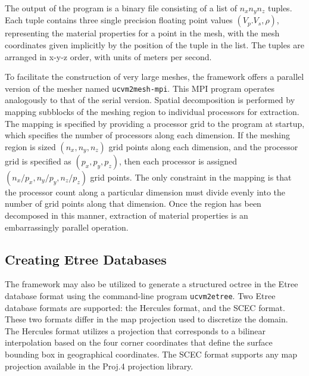 The output of the program is a binary file consisting of a list of $n_xn_yn_z$ tuples. Each tuple contains three single precision floating point values $(V_p. V_s, \rho)$, representing the material properties for a point in the mesh, with the mesh coordinates given implicitly by the position of the tuple in the list. The tuples are arranged in x-y-z order, with units of meters per second. 

To facilitate the construction of very large meshes, the framework offers a parallel version of the mesher named \texttt{ucvm2mesh-mpi}. This MPI program operates analogously to that of the serial version. Spatial decomposition is performed by mapping subblocks of the meshing region to individual processors for extraction. The mapping is specified by providing a processor grid to the program at startup, which specifies the number of processors along each dimension. If the meshing region is sized $(n_x, n_y, n_z)$ grid points along each dimension, and the processor grid is specified as $(p_x, p_y, p_z)$, then each processor is assigned $(n_x/p_x, n_y/p_y, n_z/p_z)$ grid points. The only constraint in the mapping is that the processor count along a particular dimension must divide evenly into the number of grid points along that dimension. Once the region has been decomposed in this manner, extraction of material properties is an embarrassingly parallel operation.  



\subsection{Creating Etree Databases}

The framework may also be utilized to generate a structured octree in the Etree database format \citep{Tu_2003_Tech} using the command-line program \texttt{ucvm2etree}. Two Etree database formats are supported: the Hercules format, and the SCEC format. These two formats differ in the map projection used to discretize the domain. The Hercules format utilizes a projection that corresponds to a bilinear interpolation based on the four corner coordinates that define the surface bounding box in geographical coordinates. The SCEC format supports any map projection available in the Proj.4 projection library.

